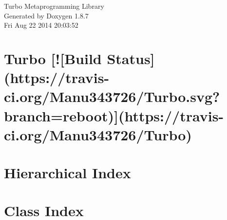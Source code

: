 \documentclass[twoside]{book}
\newcommand{\+}{\discretionary{\mbox{\scriptsize$\hookleftarrow$}}{}{}}
\newcommand{\clearemptydoublepage}{%
  \newpage{\pagestyle{empty}\cleardoublepage}%
}
\begin{document}
\hypersetup{pageanchor=false,
             bookmarks=true,
             bookmarksnumbered=true,
             pdfencoding=unicode
            }
\begin{titlepage}
\vspace*{7cm}
\begin{center}%
{\Large Turbo Metaprogramming Library }\\
\vspace*{1cm}
{\large Generated by Doxygen 1.8.7}\\
\vspace*{0.5cm}
{\small Fri Aug 22 2014 20:03:52}\\
\end{center}
\end{titlepage}
\clearemptydoublepage
\tableofcontents
\clearemptydoublepage
{}
\hypersetup{pageanchor=true}

\chapter{Turbo \mbox{[}!\mbox{[}Build Status\mbox{]}(https\+://travis-\/ci.org/\+Manu343726/\+Turbo.svg?branch=reboot)\mbox{]}(https\+://travis-\/ci.org/\+Manu343726/\+Turbo)}
\label{md_README}
\hypertarget{md_README}{}

\chapter{Hierarchical Index}

\chapter{Class Index}

\end{document}
